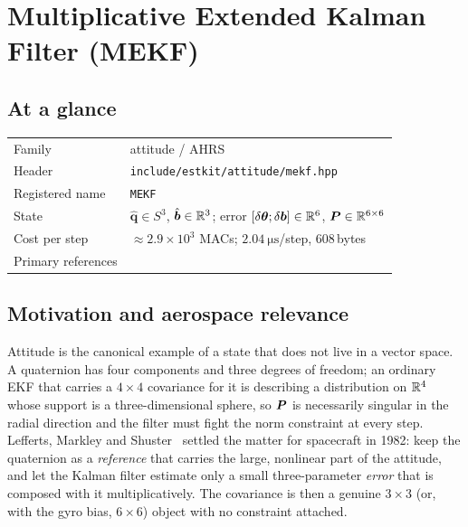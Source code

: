 \chapter{Multiplicative Extended Kalman Filter (MEKF)}
\label{ch:att-mekf}

\section*{At a glance}
\begin{tabular}{@{}l>{\raggedright\arraybackslash}p{}@{}}
Family & attitude / AHRS \\
Header & \texttt{include/estkit/attitude/mekf.hpp} \\
Registered name & \texttt{MEKF} \\
State & $\hat{\bm{q}}\in S^3$, $\hat{\bm{b}}\in\mathbb{R}^3$; error
 $[\delta\bm{\theta};\delta\bm{b}]\in\mathbb{R}^6$, $\bm{P}\in\mathbb{R}^{6\times6}$ \\
Cost per step & $\approx2.9\times10^3$ MACs; $\SI{2.04}{\micro\second}$/step, 608\,bytes \\
Primary references & \cite{lefferts1982,markley2003mekf,crassidis2007survey,farrenkopf1978,bucyjoseph1968} \\
\end{tabular}

\section{Motivation and aerospace relevance}
Attitude is the canonical example of a state that does not live in a vector space. A quaternion has
four components and three degrees of freedom; an ordinary EKF that carries a $4\times4$ covariance
for it is describing a distribution on $\mathbb{R}^4$ whose support is a three-dimensional sphere, so
$\bm{P}$ is necessarily singular in the radial direction and the filter must fight the norm constraint
at every step. Lefferts, Markley and Shuster~\cite{lefferts1982} settled the matter for spacecraft
in 1982: keep the quaternion as a \emph{reference} that carries the large, nonlinear part of the
attitude, and let the Kalman filter estimate only a small three-parameter \emph{error} that is
composed with it multiplicatively. The covariance is then a genuine $3\times3$ (or, with the gyro
bias, $6\times6$) object with no constraint attached.

